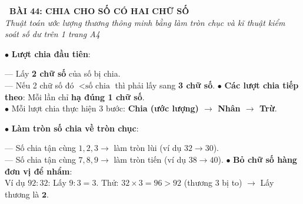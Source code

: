 \documentclass[14pt,a4paper,oneside]{extbook}
\begin{document}
\noindent
\begin{tcolorbox}[
  enhanced,
  colback=teal!8!white,
  colframe=teal!80!black,
  arc=3mm, boxrule=1pt,
  left=3mm, right=3mm, top=2mm, bottom=2mm,
  halign=center
]
  {\Large\bfseries\color{teal!90!black}\faBookmark\ BÀI 44: CHIA CHO SỐ CÓ HAI CHỮ SỐ}\\[1.5pt]
  {\footnotesize\itshape\color{black!75} Thuật toán ước lượng thương thông minh bằng làm tròn chục và kĩ thuật kiểm soát số dư trên 1 trang A4}
\end{tcolorbox}

\vspace{2mm}

\noindent
\begin{minipage}[t]{0.49\textwidth}
  \begin{tcolorbox}[
    enhanced,
    title={\footnotesize\bfseries\color{white}\faCompass\ 1. Quy trình lấy chữ số để chia},
    colback=blue!2!white,
    colframe=blue!75!black,
    arc=2.5mm, boxrule=0.8pt, top=1.8mm, bottom=1.8mm, left=2mm, right=2mm
  ]
    \footnotesize
    $\bullet$ \textbf{Lượt chia đầu tiên}:
    \par
    --- Lấy \textbf{2 chữ số} của số bị chia.\\
    --- Nếu 2 chữ số đó $< \text{số chia}$ thì phải lấy sang \textbf{3 chữ số}.
    $\bullet$ \textbf{Các lượt chia tiếp theo}: Mỗi lần chỉ \textbf{hạ đúng 1 chữ số}.\\
    $\bullet$ Mỗi lượt chia thực hiện 3 bước: \textbf{Chia (ước lượng) $\rightarrow$ Nhân $\rightarrow$ Trừ}.
  \end{tcolorbox}
\end{minipage}%
\hfill
\begin{minipage}[t]{0.49\textwidth}
  \begin{tcolorbox}[
    enhanced,
    title={\footnotesize\bfseries\color{white}\faLightbulbO\ 2. Mẹo nhẩm ước lượng thương},
    colback=teal!2!white,
    colframe=teal!75!black,
    arc=2.5mm, boxrule=0.8pt, top=1.8mm, bottom=1.8mm, left=2mm, right=2mm
  ]
    \footnotesize
    $\bullet$ \textbf{Làm tròn số chia về tròn chục}:
    \par
    --- Số chia tận cùng $1, 2, 3 \rightarrow$ làm tròn lùi (ví dụ $32 \rightarrow 30$).\\
    --- Số chia tận cùng $7, 8, 9 \rightarrow$ làm tròn tiến (ví dụ $38 \rightarrow 40$).
    $\bullet$ \textbf{Bỏ chữ số hàng đơn vị để nhẩm}:\\
    Ví dụ $92 : 32$: Lấy $9 : 3 = 3$. Thử: $32 \times 3 = 96 > 92$ (thương 3 bị to) $\rightarrow$ Lấy thương là $\mathbf{2}$.
  \end{tcolorbox}
\end{minipage}
\end{document}
